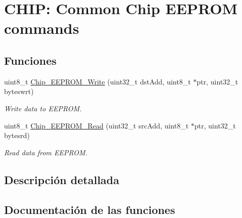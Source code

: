\hypertarget{group___c_o_m_m_o_n___e_e_p_r_o_m}{}\section{C\+H\+IP\+: Common Chip E\+E\+P\+R\+OM commands}
\label{group___c_o_m_m_o_n___e_e_p_r_o_m}
\subsection*{Funciones}
\begin{DoxyCompactItemize}
\item 
uint8\+\_\+t \hyperlink{group___c_o_m_m_o_n___e_e_p_r_o_m_gad6f8a672d415b0b1a33d02f83926413d}{Chip\+\_\+\+E\+E\+P\+R\+O\+M\+\_\+\+Write} (uint32\+\_\+t dst\+Add, uint8\+\_\+t $\ast$ptr, uint32\+\_\+t byteswrt)
\begin{DoxyCompactList}\small\item\em Write data to E\+E\+P\+R\+OM. \end{DoxyCompactList}\item 
uint8\+\_\+t \hyperlink{group___c_o_m_m_o_n___e_e_p_r_o_m_gab445a8d7640f7f5332c78171995f8d32}{Chip\+\_\+\+E\+E\+P\+R\+O\+M\+\_\+\+Read} (uint32\+\_\+t src\+Add, uint8\+\_\+t $\ast$ptr, uint32\+\_\+t bytesrd)
\begin{DoxyCompactList}\small\item\em Read data from E\+E\+P\+R\+OM. \end{DoxyCompactList}\end{DoxyCompactItemize}


\subsection{Descripción detallada}


\subsection{Documentación de las funciones}
